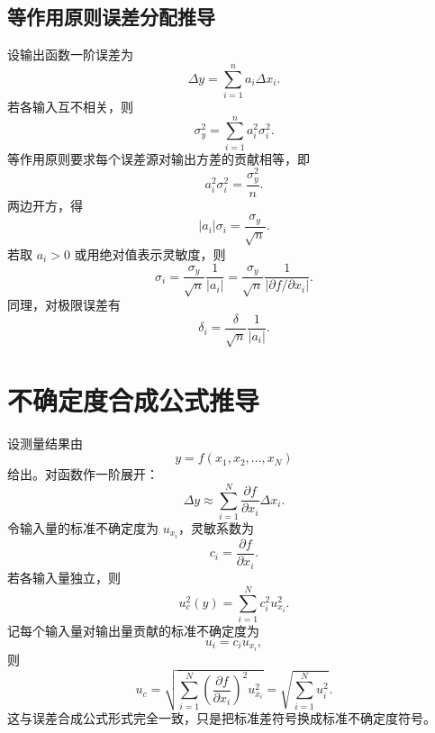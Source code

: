 \documentclass[UTF8,12pt,a4paper]{ctexart}
\newcommand{\abs}[1]{\left|#1\right|}
\begin{document}
\subsection{等作用原则误差分配推导}
设输出函数一阶误差为
\begin{equation*}
    \Delta y=\sum_{i=1}^{n}a_i\Delta x_i .
\end{equation*}
若各输入互不相关，则
\begin{equation*}
    \sigma_y^2=\sum_{i=1}^{n}a_i^2\sigma_i^2 .
\end{equation*}
等作用原则要求每个误差源对输出方差的贡献相等，即
\begin{equation*}
    a_i^2\sigma_i^2=\frac{\sigma_y^2}{n} .
\end{equation*}
两边开方，得
\begin{equation*}
    \abs{a_i}\sigma_i=\frac{\sigma_y}{\sqrt{n}} .
\end{equation*}
若取 $a_i>0$ 或用绝对值表示灵敏度，则
\begin{equation*}
    \sigma_i=\frac{\sigma_y}{\sqrt{n}}\frac{1}{\abs{a_i}}
    =\frac{\sigma_y}{\sqrt{n}}\frac{1}{\abs{\partial f/\partial x_i}} .
\end{equation*}
同理，对极限误差有
\begin{equation*}
    \delta_i=\frac{\delta}{\sqrt{n}}\frac{1}{\abs{a_i}} .
\end{equation*}

\section{不确定度合成公式推导}

设测量结果由
\begin{equation*}
    y=f(x_1,x_2,\ldots,x_N)
\end{equation*}
给出。对函数作一阶展开：
\begin{equation*}
    \Delta y\approx \sum_{i=1}^{N}\frac{\partial f}{\partial x_i}\Delta x_i .
\end{equation*}
令输入量的标准不确定度为 $u_{x_i}$，灵敏系数为
\begin{equation*}
    c_i=\frac{\partial f}{\partial x_i} .
\end{equation*}
若各输入量独立，则
\begin{equation*}
    u_c^2(y)=\sum_{i=1}^{N}c_i^2u_{x_i}^2 .
\end{equation*}
记每个输入量对输出量贡献的标准不确定度为
\begin{equation*}
    u_i=c_i u_{x_i},
\end{equation*}
则
\begin{equation*}
    u_c=\sqrt{\sum_{i=1}^{N}\left(\frac{\partial f}{\partial x_i}\right)^2u_{x_i}^2}
    =\sqrt{\sum_{i=1}^{N}u_i^2} .
\end{equation*}
这与误差合成公式形式完全一致，只是把标准差符号换成标准不确定度符号。
\end{document}
